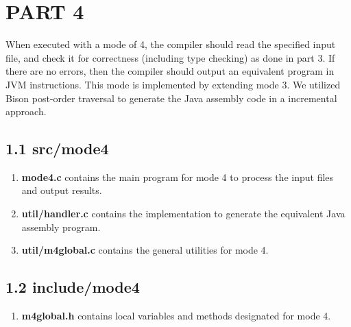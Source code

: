 \section*{PART 4}

When executed with a mode of 4, the compiler should read the specified input file, and check it for correctness (including type checking) as done in part 3. If there are no errors, then the compiler should output an equivalent program in JVM instructions. This mode is implemented by extending mode 3. We utilized Bison post-order traversal to generate the Java assembly code in a incremental approach.

\subsection*{1.1 \large\textbf{src/mode4}}
\begin{enumerate}
    
    \item \textbf{mode4.c} contains the main program for mode 4 to process the input files and output results.

    \item \textbf{util/handler.c} contains the implementation to generate the equivalent Java assembly program.

    \item \textbf{util/m4global.c} contains the general utilities for mode 4.
\end{enumerate}

\subsection*{1.2 \large\textbf{include/mode4}}
\begin{enumerate}
    \item \textbf{m4global.h} contains local variables and methods designated for mode 4.
\end{enumerate} 